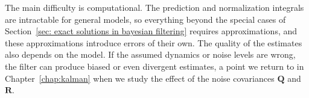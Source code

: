 The main difficulty is computational. The prediction and normalization integrals are intractable for general models, so everything beyond the special cases of Section~\ref{sec: exact solutions in bayesian filtering} requires approximations, and these approximations introduce errors of their own. The quality of the estimates also depends on the model. If the assumed dynamics or noise levels are wrong, the filter can produce biased or even divergent estimates, a point we return to in Chapter~\ref{chap:kalman} when we study the effect of the noise covariances $\mathbf{Q}$ and $\mathbf{R}$.

